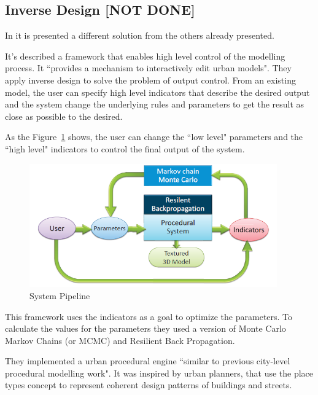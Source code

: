 
\subsection{Inverse Design [NOT DONE]} %
\label{sub:inverse_design}


In \cite{Vanegas2009} it is presented a different solution from the others already presented.

It's described a framework that enables high level control of the modelling process. It ``provides a mechanism to interactively edit urban models". They apply inverse design to solve the problem of output control. From an existing model, the user can specify high level indicators that describe the desired output and the system change the underlying rules and parameters to get the result as close as possible to the desired.

As the Figure~\ref{fig:loop} shows, the user can change the ``low level" parameters and the ``high level" indicators to control the final output of the system.

\begin{figure}[htbp]
	\centering
	\includegraphics[width=0.95\textwidth]{img/Inverse_Design/TheLoop.PNG}
	\caption{System Pipeline \cite{Vanegas2009}}
	\label{fig:loop}
\end{figure}

This framework uses the indicators as a goal to optimize the parameters. To calculate the values for the parameters they used a version of Monte Carlo Markov Chains (or MCMC) and Resilient Back Propagation.


They implemented a urban procedural engine ``similar to previous city-level procedural modelling work". It was inspired by urban planners, that use the place types concept to represent coherent design patterns of buildings and streets. 


